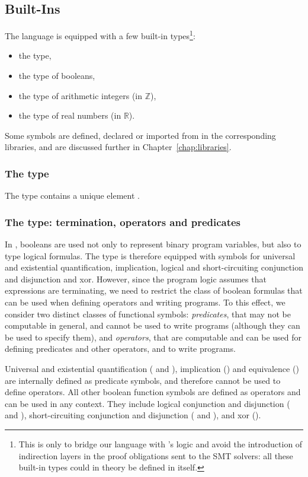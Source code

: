 \subsection{Built-Ins}
The language is equipped with a few built-in types\footnote{This is only to
bridge our language with \WhyThree's logic and avoid the introduction of
indirection layers in the proof obligations sent to the SMT solvers: all these
built-in types could in theory be defined in \EC itself.}:
\begin{itemize}
\item the  type,
\item the  type of booleans,
\item the  type of arithmetic integers (in $\mathbb{Z}$),
\item the  type of real numbers (in $\mathbb{R}$).
\end{itemize}

Some symbols are defined, declared or imported from \WhyThree in the
corresponding libraries, and are discussed further in
Chapter~\ref{chap:libraries}.

\subsubsection*{The  type}
The  type contains a unique element .

\subsubsection*{The  type: termination, operators and predicates}
In \EC, booleans are used not only to represent binary program variables, but
also to type logical formulas. The  type is therefore equipped with
symbols for universal and existential quantification, implication, logical and
short-circuiting conjunction and disjunction and xor. However, since the program
logic assumes that expressions are terminating, we need to restrict the class of
boolean formulas that can be used when defining operators and writing programs.
To this effect, we consider two distinct classes of functional symbols:
\emph{predicates}, that may not be computable in general, and cannot be used to
write programs (although they can be used to specify them), and
\emph{operators}, that are computable and can be used for defining predicates
and other operators, and to write programs.

Universal and existential quantification ( and ),
implication (\rawec{=>}) and equivalence (\rawec{<=>}) are internally defined as
predicate symbols, and therefore cannot be used to define operators. All other
boolean function symbols are defined as operators and can be used in any
context. They include logical conjunction and disjunction (\rawec{/\\} and
\rawec{\\\/}), short-circuiting conjunction and disjunction (\rawec{\&\&} and
\rawec{\|\|}), and xor (\rawec{\^\^}).

